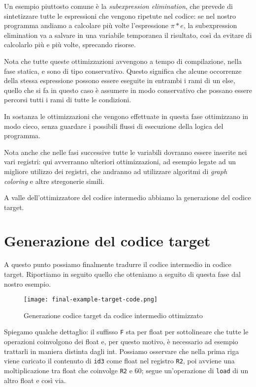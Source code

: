 \documentclass[class=book, crop=false, oneside, 12pt]{standalone}
\begin{document}
Un esempio piuttosto comune è la \emph{subexpression elimination}, che prevede di sintetizzare tutte le espressioni che vengono ripetute nel codice: se nel nostro programma andiamo a calcolare più volte l'espressione \(\pi * e\), la subexpression elimination va a salvare in una variabile temporanea il risultato, così da evitare di calcolarlo più e più volte, sprecando risorse.

Nota che tutte queste ottimizzazioni avvengono a tempo di compilazione, nella fase statica, e sono di tipo conservativo. Questo significa che alcune occorrenze della stessa espressione possono essere eseguite in entrambi i rami di un else, quello che si fa in questo caso è assumere in modo conservativo che possano essere percorsi tutti i rami di tutte le condizioni.

In sostanza le ottimizzazioni che vengono effettuate in questa fase ottimizzano in modo cieco, senza guardare i possibili flussi di esecuzione della logica del programma.

Nota anche che nelle fasi successive tutte le variabili dovranno essere inserite nei vari registri: qui avverranno ulteriori ottimizzazioni, ad esempio legate ad un migliore utilizzo dei registri, che andranno ad utilizzare algoritmi di \emph{graph coloring} e altre stregonerie simili.

A valle dell'ottimizzatore del codice intermedio abbiamo la generazione del codice target.

\section{Generazione del codice target}
A questo punto possiamo finalmente tradurre il codice intermedio in codice target. Riportiamo in seguito quello che otteniamo a seguito di questa fase dal nostro esempio.
\begin{figure}[H]
    \centering
    \texttt{[image: final-example-target-code.png]}
    \caption{Generazione codice target da codice intermedio ottimizzato}
    \label{fig:final-example-target-code}
\end{figure}
Spiegamo qualche dettaglio: il suffisso \texttt{F} sta per float per sottolineare che tutte le operazioni coinvolgono dei float e, per questo motivo, è necessario ad esempio trattarli in maniera distinta dagli int. Possiamo osservare che nella prima riga viene caricato il contenuto di \texttt{id3} come float nel registro \texttt{R2}, poi avviene una moltiplicazione tra float che coinvolge \texttt{R2} e \(60\); segue un'operazione di \texttt{load} di un altro float e così via.
\end{document}
